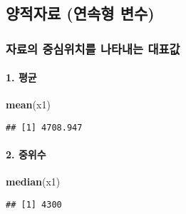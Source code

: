 \documentclass[
]{article}
\newenvironment{Shaded}{\begin{snugshade}}{\end{snugshade}}
\newcommand{\CommentTok}[1]{\textcolor[rgb]{0.56,0.35,0.01}{\textit{#1}}}
\newcommand{\FunctionTok}[1]{\textcolor[rgb]{0.13,0.29,0.53}{\textbf{#1}}}
\newcommand{\NormalTok}[1]{#1}
\newcommand{\OtherTok}[1]{\textcolor[rgb]{0.56,0.35,0.01}{#1}}
\newcommand{\SpecialCharTok}[1]{\textcolor[rgb]{0.81,0.36,0.00}{\textbf{#1}}}
\begin{document}
\begin{Shaded}
\end{Shaded}

\hypertarget{uxc591uxc801uxc790uxb8cc-uxc5f0uxc18duxd615-uxbcc0uxc218}{%
\subsection{양적자료 (연속형
변수)}\label{uxc591uxc801uxc790uxb8cc-uxc5f0uxc18duxd615-uxbcc0uxc218}}

\hypertarget{uxc790uxb8ccuxc758-uxc911uxc2ecuxc704uxce58uxb97c-uxb098uxd0c0uxb0b4uxb294-uxb300uxd45cuxac12}{%
\subsubsection{자료의 중심위치를 나타내는
대표값}\label{uxc790uxb8ccuxc758-uxc911uxc2ecuxc704uxce58uxb97c-uxb098uxd0c0uxb0b4uxb294-uxb300uxd45cuxac12}}

\hypertarget{uxd3c9uxade0}{%
\paragraph{1. 평균}\label{uxd3c9uxade0}}

\begin{Shaded}
\begin{Highlighting}[]
\FunctionTok{mean}\NormalTok{(x1)}
\end{Highlighting}
\end{Shaded}

\begin{verbatim}
## [1] 4708.947
\end{verbatim}

\hypertarget{uxc911uxc704uxc218}{%
\paragraph{2. 중위수}\label{uxc911uxc704uxc218}}

\begin{Shaded}
\begin{Highlighting}[]
\FunctionTok{median}\NormalTok{(x1)}
\end{Highlighting}
\end{Shaded}

\begin{verbatim}
## [1] 4300
\end{verbatim}
\end{document}
